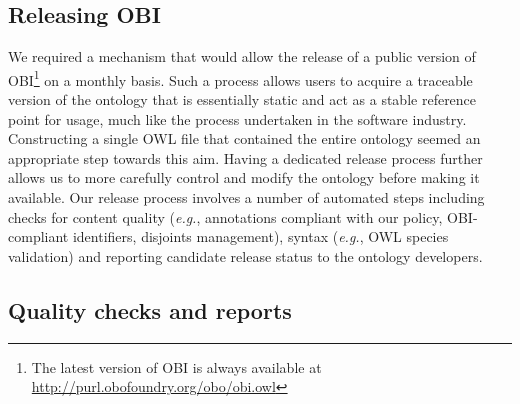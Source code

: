 \documentclass{elsart}       %
\begin{document}
\subsection{Releasing OBI}

We required a mechanism that would allow the release of a public version of OBI\footnote{The latest version of OBI is always available at \url{http://purl.obofoundry.org/obo/obi.owl}} on a monthly basis.
 Such a process allows users to acquire a traceable version of the ontology that is essentially static and act as a stable reference point for usage, much like the process undertaken in the software industry. 
 Constructing a single OWL file that contained the entire ontology seemed an appropriate step towards this aim.
Having a dedicated release process further allows us to more carefully control and modify the ontology before making it available.
Our release process involves a number of automated steps including checks for content quality (\emph{e.g.}, annotations compliant with our policy, OBI-compliant identifiers, disjoints management), syntax (\emph{e.g.}, OWL species validation) and reporting candidate release status to the ontology developers.

\subsection{Quality checks and reports}
\end{document}
